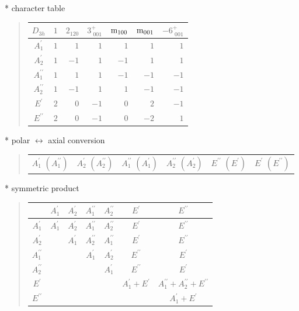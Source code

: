 \documentclass[fleqn,10pt,landscape]{jsarticle}
\begin{document}
* character table
\begin{quote}
\begin{tabular}{crrrrrr} \hline \hline
$ D_{3h} $ & $ 1 $ & $ 2{}_{120} $ & $ 3^{+}_{\,\,001} $ & $ {\rm m}_{100} $ & $ {\rm m}_{001} $ & $ -6^{+}_{\,\,001} $ \\ \hline
$ A_{1}^{\prime} $ & $ 1 $ & $ 1 $ & $ 1 $ & $ 1 $ & $ 1 $ & $ 1 $ \\
$ A_{2}^{\prime} $ & $ 1 $ & $ -1 $ & $ 1 $ & $ -1 $ & $ 1 $ & $ 1 $ \\
$ A_{1}^{\prime\prime} $ & $ 1 $ & $ 1 $ & $ 1 $ & $ -1 $ & $ -1 $ & $ -1 $ \\
$ A_{2}^{\prime\prime} $ & $ 1 $ & $ -1 $ & $ 1 $ & $ 1 $ & $ -1 $ & $ -1 $ \\
$ E^{\prime} $ & $ 2 $ & $ 0 $ & $ -1 $ & $ 0 $ & $ 2 $ & $ -1 $ \\
$ E^{\prime\prime} $ & $ 2 $ & $ 0 $ & $ -1 $ & $ 0 $ & $ -2 $ & $ 1 $ \\
 \hline \hline
\end{tabular}
\end{quote}
* polar $\leftrightarrow$ axial conversion
\begin{quote}
\begin{tabular}{cccccc}
$ A_{1}^{\prime}\,\,(A_{1}^{\prime\prime}) $ & $ A_{2}^{\prime}\,\,(A_{2}^{\prime\prime}) $ & $ A_{1}^{\prime\prime}\,\,(A_{1}^{\prime}) $ & $ A_{2}^{\prime\prime}\,\,(A_{2}^{\prime}) $ & $ E^{\prime\prime}\,\,(E^{\prime}) $ & $ E^{\prime}\,\,(E^{\prime\prime}) $
\end{tabular}
\end{quote}
* symmetric product
\begin{quote}
\begin{tabular}{c|cccccc} \hline \hline
 & $ A_{1}^{\prime} $ & $ A_{2}^{\prime} $ & $ A_{1}^{\prime\prime} $ & $ A_{2}^{\prime\prime} $ & $ E^{\prime} $ & $ E^{\prime\prime} $ \\ \hline
$ A_{1}^{\prime} $ & $ A_{1}^{\prime} $ & $ A_{2}^{\prime} $ & $ A_{1}^{\prime\prime} $ & $ A_{2}^{\prime\prime} $ & $ E^{\prime} $ & $ E^{\prime\prime} $ \\
$ A_{2}^{\prime} $ & $  $ & $ A_{1}^{\prime} $ & $ A_{2}^{\prime\prime} $ & $ A_{1}^{\prime\prime} $ & $ E^{\prime} $ & $ E^{\prime\prime} $ \\
$ A_{1}^{\prime\prime} $ & $  $ & $  $ & $ A_{1}^{\prime} $ & $ A_{2}^{\prime} $ & $ E^{\prime\prime} $ & $ E^{\prime} $ \\
$ A_{2}^{\prime\prime} $ & $  $ & $  $ & $  $ & $ A_{1}^{\prime} $ & $ E^{\prime\prime} $ & $ E^{\prime} $ \\
$ E^{\prime} $ & $  $ & $  $ & $  $ & $  $ & $ A_{1}^{\prime} + E^{\prime} $ & $ A_{1}^{\prime\prime} + A_{2}^{\prime\prime} + E^{\prime\prime} $ \\
$ E^{\prime\prime} $ & $  $ & $  $ & $  $ & $  $ & $  $ & $ A_{1}^{\prime} + E^{\prime} $ \\
 \hline \hline
\end{tabular}
\end{quote}
\end{document}
